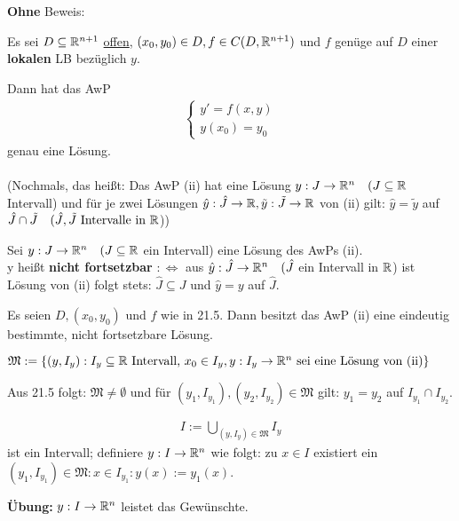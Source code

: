 \documentclass[a4paper,twoside,DIV15,BCOR12mm,chapterprefix=true,headings=twolinechapter]{scrbook}
\begin{document}
\textbf{Ohne} Beweis:
\begin{satz}
Es sei $D \subseteq \mathbb{R}^{n+1}$ \underline{offen}, $(x_0, y_0) \in D, f\in C(D, \mathbb{R}^{n+1})$ und $f$ genüge auf $D$ einer \textbf{lokalen} LB bezüglich $y$.

Dann hat das AwP
\begin{align*} \begin{cases}
y' = f(x,y)\\
y(x_0) = y_0
\end{cases}
\label{(ii)}
\end{align*}
genau eine Lösung.
\\
\\
(Nochmals, das heißt: Das AwP (ii) hat eine Lösung $y: J \to \mathbb{R}^n\quad(J \subseteq \mathbb{R}$ 
Intervall) und für je zwei Lösungen $\hat y : \hat J \to \mathbb{R}, \tilde y : \tilde J \to \mathbb{R}$ 
von (ii) gilt: $\hat y = \tilde y$ auf $\hat J \cap \tilde J \quad (\hat J, \tilde J \text{ Intervalle in } \mathbb{R}$))
\end{satz}

\begin{definition}
Sei $y: J \to \mathbb{R}^n\quad(J \subseteq \mathbb{R}$ ein Intervall) eine Lösung des AwPs (ii).\\
y heißt \textbf{nicht fortsetzbar} $:\iff$ aus $\hat y : \hat J \to \mathbb{R}^n\quad(\hat J$ ein Intervall in $\mathbb{R}$) ist Lösung von (ii) folgt stets: $\hat J \subseteq J$ und $\hat y = y$ auf $\hat J$.
\end{definition}

\begin{satz}
Es seien $D, (x_0, y_0)$ und $f$ wie in 21.5. Dann besitzt das AwP (ii) eine eindeutig bestimmte, nicht fortsetzbare Lösung.
\end{satz}

\begin{beweis}
$\mathfrak{M} := \{ (y,I_y) : I_y \subseteq \mathbb{R} \text{ Intervall, } x_0 \in I_y, y: I_y \to \mathbb{R}^n \text{ sei eine Lösung von (ii)} \}$

Aus 21.5 folgt: $\mathfrak{M} \ne \emptyset$ und für $(y_1, I_{y_1}), (y_2, I_{y_2}) \in \mathfrak{M}$ gilt: $y_1 = y_2$ auf $I_{y_1} \cap I_{y_2}$.

\begin{align*}I := \bigcup_{(y, I_y) \in \mathfrak{M}} I_y\end{align*} ist ein Intervall; definiere $y: I \to \mathbb{R}^n$ wie folgt: zu $x \in I$ existiert ein $(y_1, I_{y_1}) \in \mathfrak{M}: x \in I_{y_1}: y(x) := y_1(x)$.

\textbf{Übung:} $y: I \to \mathbb{R}^n$ leistet das Gewünschte.
\end{beweis}
\end{document}
